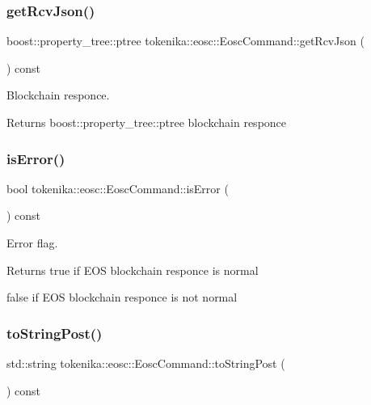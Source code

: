 \subsubsection{\texorpdfstring{get\+Rcv\+Json()}{getRcvJson()}}
{\footnotesize\ttfamily boost\+::property\+\_\+tree\+::ptree tokenika\+::eosc\+::\+Eosc\+Command\+::get\+Rcv\+Json (\begin{DoxyParamCaption}{ }\end{DoxyParamCaption}) const\hspace{0.3cm}{\ttfamily [inline]}}



Blockchain responce. 

\begin{DoxyReturn}{Returns}
boost\+::property\+\_\+tree\+::ptree blockchain responce 
\end{DoxyReturn}
\mbox{\label{classtokenika_1_1eosc_1_1_eosc_command_a63f3adace3f84b59f64c5a54ca0c18dc}} 
\subsubsection{\texorpdfstring{is\+Error()}{isError()}}
{\footnotesize\ttfamily bool tokenika\+::eosc\+::\+Eosc\+Command\+::is\+Error (\begin{DoxyParamCaption}{ }\end{DoxyParamCaption}) const\hspace{0.3cm}{\ttfamily [inline]}}



Error flag. 

\begin{DoxyReturn}{Returns}
true if E\+OS blockchain responce is normal 

false if E\+OS blockchain responce is not normal 
\end{DoxyReturn}
\mbox{\label{classtokenika_1_1eosc_1_1_eosc_command_a1cb0362dceb5999e7e06078223b20d91}} 
\subsubsection{\texorpdfstring{to\+String\+Post()}{toStringPost()}}
{\footnotesize\ttfamily std\+::string tokenika\+::eosc\+::\+Eosc\+Command\+::to\+String\+Post (\begin{DoxyParamCaption}{ }\end{DoxyParamCaption}) const}




